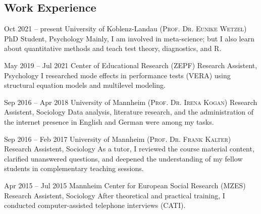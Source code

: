 \documentclass[10pt]{FreemanCV}
\begin{document}
\begin{paracol}{2}
\section{Work Experience}





\jobentry
	{Oct 2021 -- present} 
	{} 
	{University of Koblenz-Landau \hfill{\footnotesize{\textsc{(Prof. Dr. Eunike Wetzel)}}}}
	{PhD Student, Psychology}
	{Mainly, I am involved in meta-science; but I also learn about quantitative methods and teach test theory, diagnostics, and R.}


\jobentry
	{May 2019 -- Jul 2021}
	{} 
	{Center of Educational Research
	\hfill\footnotesize{\textsc{(ZEPF)}}}
	{Research Assistent, Psychology}  
	{I researched mode effects in performance tests (\textsc{VERA}) using structural equation models and multilevel modeling.}


\jobentry
	{Sep 2016 -- Apr 2018}
	{} 
	{University of Mannheim
	\hfill\footnotesize{\textsc{(Prof. Dr. Irena Kogan)}}}
	{Research Assistent, Sociology}
	{Data analysis, literature research, and the administration of the internet presence in English and German were among my tasks.}


\jobentry
	{Sep 2016 -- Feb 2017}
	{} 
	{University of Mannheim
	\hfill\footnotesize{\textsc{(Prof. Dr. Frank Kalter)}}}
	{Research Assistent, Sociology}
	{As a tutor, I reviewed the course material content, clarified unanswered questions, and deepened the understanding of my fellow students in complementary teaching sessions.}


\jobentry
	{Apr 2015 -- Jul 2015}
	{} 
	{Mannheim Center for European Social Research
	\hfill\footnotesize{\textsc{(MZES)}}}
	{Research Assistent, Sociology}  
	{After theoretical and practical training, I conducted computer-assisted telephone interviews (CATI).}


\end{paracol}
\end{document}
